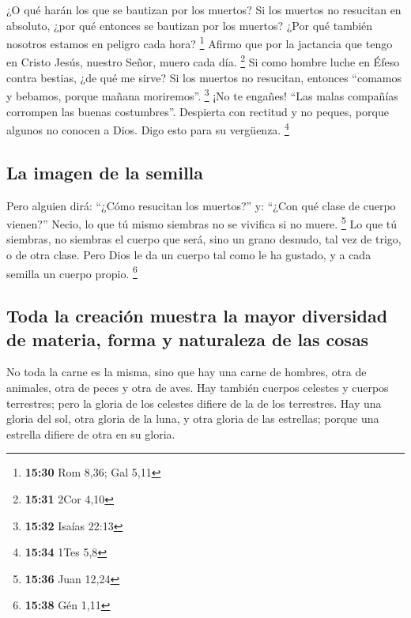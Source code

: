  ¿O qué harán los que se bautizan por los muertos? Si los
muertos no resucitan en absoluto, ¿por qué entonces se bautizan por los
muertos?  ¿Por qué también nosotros estamos en peligro
cada hora? \footnote{\textbf{15:30} Rom 8,36; Gal 5,11} 
Afirmo que por la jactancia que tengo en Cristo Jesús, nuestro Señor,
muero cada día. \footnote{\textbf{15:31} 2Cor 4,10}  Si
como hombre luche en Éfeso contra bestias, ¿de qué me sirve? Si los
muertos no resucitan, entonces ``comamos y bebamos, porque mañana
moriremos''. \footnote{\textbf{15:32} Isaías 22:13}  ¡No
te engañes! ``Las malas compañías corrompen las buenas costumbres''.
 Despierta con rectitud y no peques, porque algunos no
conocen a Dios. Digo esto para su vergüenza. \footnote{\textbf{15:34}
  1Tes 5,8}

\hypertarget{la-imagen-de-la-semilla}{%
\subsection{La imagen de la semilla}\label{la-imagen-de-la-semilla}}

 Pero alguien dirá: ``¿Cómo resucitan los muertos?'' y:
``¿Con qué clase de cuerpo vienen?''  Necio, lo que tú
mismo siembras no se vivifica si no muere. \footnote{\textbf{15:36} Juan
  12,24}  Lo que tú siembras, no siembras el cuerpo que
será, sino un grano desnudo, tal vez de trigo, o de otra clase.
 Pero Dios le da un cuerpo tal como le ha gustado, y a
cada semilla un cuerpo propio. \footnote{\textbf{15:38} Gén 1,11}

\hypertarget{toda-la-creaciuxf3n-muestra-la-mayor-diversidad-de-materia-forma-y-naturaleza-de-las-cosas}{%
\subsection{Toda la creación muestra la mayor diversidad de materia,
forma y naturaleza de las
cosas}\label{toda-la-creaciuxf3n-muestra-la-mayor-diversidad-de-materia-forma-y-naturaleza-de-las-cosas}}

 No toda la carne es la misma, sino que hay una carne de
hombres, otra de animales, otra de peces y otra de aves. 
Hay también cuerpos celestes y cuerpos terrestres; pero la gloria de los
celestes difiere de la de los terrestres.  Hay una gloria
del sol, otra gloria de la luna, y otra gloria de las estrellas; porque
una estrella difiere de otra en su gloria.

